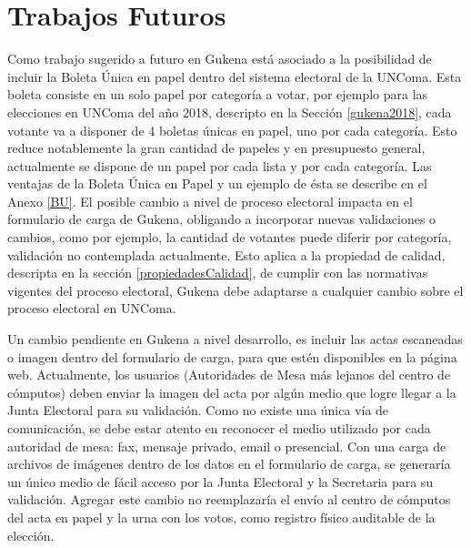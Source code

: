 \section{Trabajos Futuros}

Como trabajo sugerido a futuro en Gukena está asociado a la posibilidad de incluir la Boleta Única en papel dentro del sistema electoral de la UNComa. Esta boleta consiste en un solo papel por categoría a votar, por ejemplo para las elecciones en UNComa del año 2018, descripto en la Sección \ref{gukena2018}, cada votante va a disponer de 4 boletas únicas en papel, uno por cada categoría. Esto reduce notablemente la gran cantidad de papeles y en presupuesto general, actualmente se dispone de un papel por cada lista y por cada categoría. Las ventajas de la Boleta Única en Papel y un ejemplo de ésta se describe en el Anexo \ref{BU}. El posible cambio a nivel de proceso electoral impacta en el formulario de carga de Gukena, obligando a incorporar nuevas validaciones o cambios, como por ejemplo, la cantidad de votantes puede diferir por categoría, validación no contemplada actualmente. Esto aplica a la propiedad de calidad, descripta en la sección \ref{propiedadesCalidad}, de cumplir con las normativas vigentes del proceso electoral, Gukena debe adaptarse a cualquier cambio sobre el proceso electoral en UNComa. 

Un cambio pendiente en Gukena a nivel desarrollo, es incluir las actas escaneadas o imagen dentro del formulario de carga, para que estén disponibles en la página web. Actualmente, los usuarios (Autoridades de Mesa más lejanos del centro de cómputos) deben enviar la imagen del acta por algún medio que logre llegar a la Junta Electoral para su validación. Como no existe una única vía de comunicación, se debe estar atento en reconocer el medio utilizado por cada autoridad de mesa: fax, mensaje privado, email o presencial. Con una carga de archivos de imágenes dentro de los datos en el formulario de carga, se generaría un único medio de fácil acceso por la Junta Electoral y la Secretaria para su validación.
Agregar este cambio no reemplazaría el envío al centro de cómputos del acta en papel y la urna con los votos, como registro físico auditable de la elección. 
